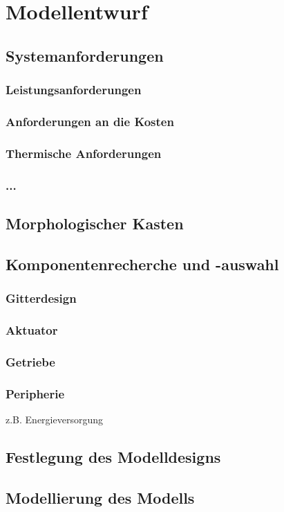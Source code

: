\chapter{Modellentwurf}\label{sec:modellentwurf}

\section{Systemanforderungen}
\subsection{Leistungsanforderungen}
\subsection{Anforderungen an die Kosten}
\subsection{Thermische Anforderungen}
\subsection{...}

\section{Morphologischer Kasten}

\section{Komponentenrecherche und -auswahl}
\subsection{Gitterdesign}
\subsection{Aktuator}
\subsection{Getriebe}
\subsection{Peripherie}
z.B. Energieversorgung

\section{Festlegung des Modelldesigns}

\section{Modellierung des Modells}
